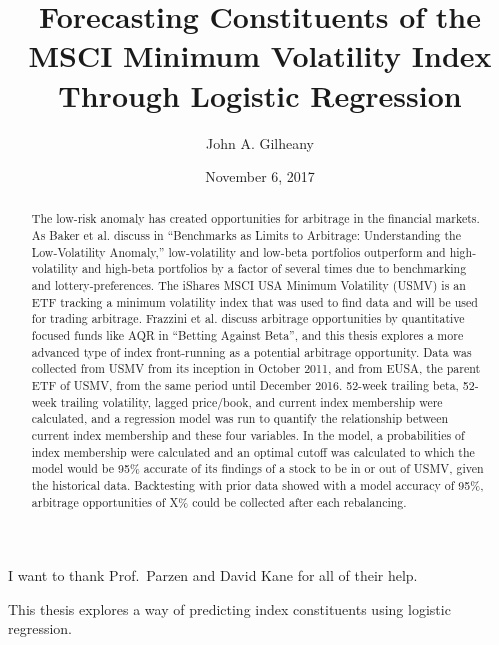 \documentclass[12pt,twoside]{reedthesis}
\title{Forecasting Constituents of the MSCI Minimum Volatility Index Through
Logistic Regression}
\author{John A. Gilheany}
\date{November 6, 2017}
\theoremstyle{definition}
\theoremstyle{definition}
\theoremstyle{definition}
\theoremstyle{remark}
\begin{document}
  \maketitle

\frontmatter %
\pagestyle{empty} %
  \begin{acknowledgements}
    I want to thank Prof.~Parzen and David Kane for all of their help.
  \end{acknowledgements}
  \begin{preface}
    This thesis explores a way of predicting index constituents using
    logistic regression.
  \end{preface}
  \hypersetup{linkcolor=black}
  \setcounter{tocdepth}{2}
  \tableofcontents

  \listoftables

  \listoffigures
  \begin{abstract}
    The low-risk anomaly has created opportunities for arbitrage in the
    financial markets. As Baker et al. discuss in ``Benchmarks as Limits to
    Arbitrage: Understanding the Low-Volatility Anomaly,'' low-volatility
    and low-beta portfolios outperform and high-volatility and high-beta
    portfolios by a factor of several times due to benchmarking and
    lottery-preferences. The iShares MSCI USA Minimum Volatility (USMV) is
    an ETF tracking a minimum volatility index that was used to find data
    and will be used for trading arbitrage. Frazzini et al. discuss
    arbitrage opportunities by quantitative focused funds like AQR in
    ``Betting Against Beta'', and this thesis explores a more advanced type
    of index front-running as a potential arbitrage opportunity. Data was
    collected from USMV from its inception in October 2011, and from EUSA,
    the parent ETF of USMV, from the same period until December 2016.
    52-week trailing beta, 52-week trailing volatility, lagged price/book,
    and current index membership were calculated, and a regression model was
    run to quantify the relationship between current index membership and
    these four variables. In the model, a probabilities of index membership
    were calculated and an optimal cutoff was calculated to which the model
    would be 95\% accurate of its findings of a stock to be in or out of
    USMV, given the historical data. Backtesting with prior data showed with
    a model accuracy of 95\%, arbitrage opportunities of X\% could be
    collected after each rebalancing.
  \end{abstract}
\end{document}
